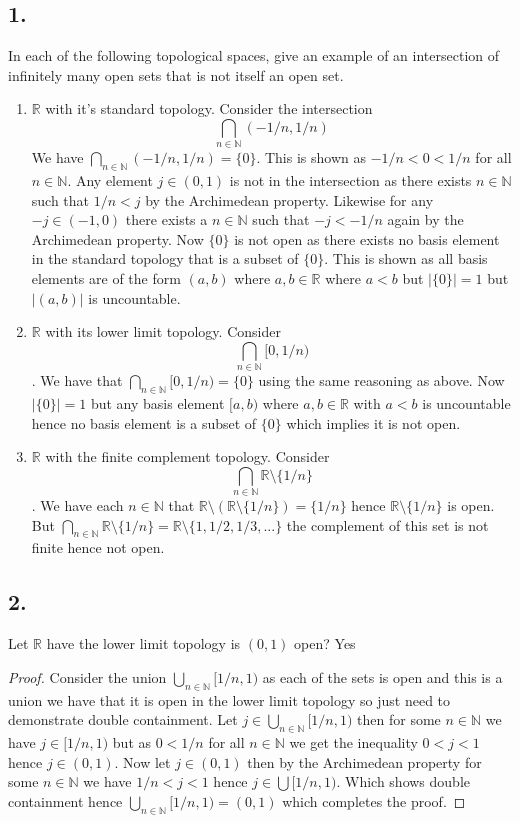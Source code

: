 \documentclass{amsart}
\theoremstyle{plain}
\theoremstyle{definition}
\theoremstyle{remark}
\begin{document}
\noindent
\subsection*{1.}
In each of the following topological spaces, give an example of an intersection of infinitely many open sets that is not itself an open set. 
\begin{enumerate}
    \item $\mathbb{R}$ with it's standard topology. Consider the intersection 
    \[
        \bigcap_{n\in \mathbb{N}}(-1/n,1/n)
    \] 
    We have $\bigcap_{n\in \mathbb{N}}(-1/n,1/n)=\{0\}$. This is shown as $-1/n<0<1/n$ for all $n\in \mathbb{N}$. Any element $j\in(0,1)$ is not in the intersection as there exists $n\in \mathbb{N}$ such that $1/n<j$ by the Archimedean property. Likewise for any $-j\in (-1,0)$ there exists a $n\in \mathbb{N}$ such that $-j<-1/n$ again by the Archimedean property. Now $\{0\}$ is not open as there exists no basis element in the standard topology that is a subset of $\{0\}$. This is shown as all basis elements are of the form $(a,b)$ where $a,b\in \mathbb{R}$ where $a<b$ but $|\{0\}|=1$ but $|(a,b)|$ is uncountable. 
    \item $\mathbb{R}$ with its lower limit topology. Consider \[\bigcap _{n\in \mathbb{N}}[0,1/n)\]. We have that $\bigcap_{n\in \mathbb{N}}[0,1/n)=\{0\}$ using the same reasoning as above. Now $|\{0\}|=1$ but any basis element $[a,b)$ where $a,b\in \mathbb{R}$ with $a<b$ is uncountable hence no basis element is a subset of $\{0\}$ which implies it is not open. 
    \item $\mathbb{R}$ with the finite complement topology. Consider \[\bigcap _{n\in \mathbb{N}}\mathbb{R}\setminus \{1/n\}\]. We have each $n\in \mathbb{N}$ that $\mathbb{R}\setminus (\mathbb{R}\setminus \{1/n\})=\{1/n\}$ hence $\mathbb{R}\setminus \{1/n\}$ is open. But $\bigcap_{n\in \mathbb{N}}\mathbb{R}\setminus \{1/n\}=\mathbb{R}\setminus \{1,1/2,1/3,...\}$ the complement of this set is not finite hence not open. 
\end{enumerate}

\noindent
\subsection*{2.}
Let $\mathbb{R}$ have the lower limit topology is $(0,1)$ open?
Yes 
\begin{proof}
Consider the union $\bigcup_{n\in \mathbb{N}}[1/n,1)$ as each of the sets is open and this is a union we have that it is open in the lower limit topology so just need to demonstrate double containment. Let $j\in \bigcup_{n\in \mathbb{N}}[1/n,1)$ then for some $n\in \mathbb{N}$ we have $j\in [1/n,1)$ but as $0<1/n$ for all $n\in \mathbb{N}$ we get the inequality $0<j<1$ hence $j\in (0,1)$. Now let $j\in (0,1)$ then by the Archimedean property for some $n\in \mathbb{N}$ we have $1/n<j<1$ hence $j\in \bigcup [1/n,1)$. Which shows double containment hence $\bigcup_{n\in \mathbb{N}}[1/n,1)=(0,1)$ which completes the proof.

\end{proof}
\end{document}
